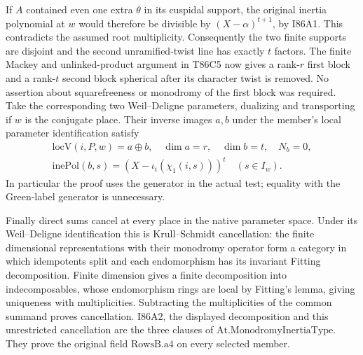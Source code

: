 If $A$ contained even one extra $\theta$ in its cuspidal
support, the original inertia polynomial at $w$ would therefore
be divisible by $(X-\alpha)^{t+1}$, by I86A1. This contradicts
the assumed root multiplicity. Consequently the two finite
supports are disjoint and the second unramified-twist line has
exactly $t$ factors. The finite Mackey and unlinked-product
argument in T86C5 now gives a rank-$r$ first block and a rank-$t$
second block spherical after its character twist is removed.
No assertion about squarefreeness or monodromy of the first
block was required. Take the corresponding two Weil--Deligne
parameters, dualizing and transporting if $w$ is the conjugate
place. Their inverse images $a,b$ under the member's local
parameter identification satisfy
\[
 \begin{gathered}\mathrm{locV}(i,P,w)=a\oplus b,\quad
 \dim a=r,\quad\dim b=t,\quad N_b=0,\\
 \mathrm{inePol}(b,s)=(X-\iota_i(\chi_1(i,s)))^t\quad(s\in I_w).\end{gathered}
\]
In particular the proof uses the generator in the actual test;
equality with the Green-label generator is unnecessary.

Finally direct sums cancel at every place in the native parameter
space. Under its Weil--Deligne identification this is
Krull--Schmidt cancellation: the finite dimensional representations
with their monodromy operator form a category in which idempotents
split and each endomorphism has its invariant Fitting decomposition.
Finite dimension gives a finite decomposition into indecomposables,
whose endomorphism rings are local by Fitting's lemma, giving
uniqueness with multiplicities. Subtracting the multiplicities of
the common summand proves cancellation. I86A2, the displayed
decomposition and this unrestricted cancellation are the three
clauses of $\mathrm{At.MonodromyInertiaType}$. They prove the
original field $\mathrm{RowsB.a4}$ on every selected member.
